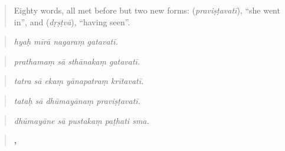 \begin{quote}
Eighty words, all met before but two new forms: \textbf{} (\emph{praviṣṭavatī}), \textquotedblleft{}she went in\textquotedblright{}, and \textbf{} (\emph{dṛṣṭvā}), \textquotedblleft{}having seen\textquotedblright{}.
\end{quote}

\begin{tcolorbox}[breakable,skin=enhanced,colback=orange!6,colframe=orange!45!black,boxrule=0.5pt,arc=1mm,left=6pt,right=6pt,top=4pt,bottom=4pt,fonttitle=\bfseries,title={Read this}]
\begin{quote}
\textbf{   }
\end{quote}

\begin{quote}
\emph{hyaḥ mīrā nagaraṃ gatavatī.}
\end{quote}

\begin{quote}
\textbf{   }
\end{quote}

\begin{quote}
\emph{prathamaṃ sā sthānakaṃ gatavatī.}
\end{quote}

\begin{quote}
\textbf{    }
\end{quote}

\begin{quote}
\emph{tatra sā ekaṃ yānapatraṃ krītavatī.}
\end{quote}

\begin{quote}
\textbf{   }
\end{quote}

\begin{quote}
\emph{tataḥ sā dhūmayānaṃ praviṣṭavatī.}
\end{quote}

\begin{quote}
\textbf{    }
\end{quote}

\begin{quote}
\emph{dhūmayāne sā pustakaṃ paṭhati sma.}
\end{quote}

\begin{quote}
\textbf{   ,   }
\end{quote}


\end{tcolorbox}
